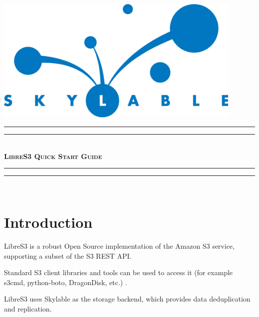 \pagestyle{empty}

\begin{center}
    \includegraphics[width=119mm]{logo.eps}\\
    \vspace{4cm}
    \rule{\textwidth}{1.6pt}\vspace*{-\baselineskip}\vspace*{2pt}
    \rule{\textwidth}{0.4pt}\\[\baselineskip]
    {\fontsize{40}{50}\bfseries\scshape LibreS3 Quick Start Guide}
    \rule{\textwidth}{0.4pt}\vspace*{-\baselineskip}\vspace{3.2pt}
    \rule{\textwidth}{1.6pt}\\[\baselineskip]
\end{center}


\newcommand{\marked}[1]{\color{yellow}\textbf{#1}}
\newcommand{\markedG}[1]{\color{green}\textbf{#1}}
\newcommand{\cmark}{\ding{51}}%
\newcommand{\xmark}{\ding{55}}%

\chapter{Introduction}

\indent LibreS3 is a robust Open Source implementation of the Amazon S3 service,
supporting a subset of the S3 REST API.

Standard S3 client libraries and tools can be used to access it (for example s3cmd, python-boto, DragonDisk, etc.) .

LibreS3 uses Skylable \SX as the storage backend, which provides data
deduplication and replication.

